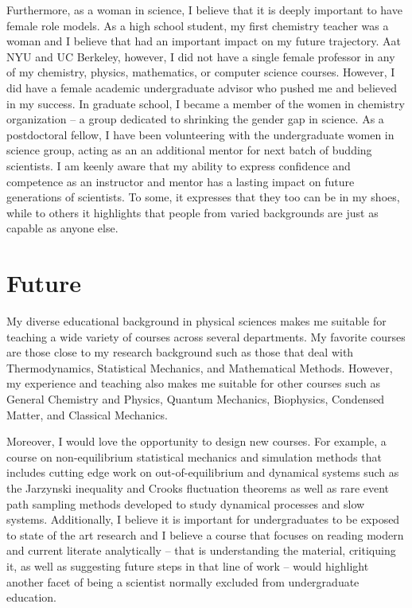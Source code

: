 \documentclass[11pt]{article}
\begin{document}
Furthermore, as a woman in science, I believe that it is deeply important to have female role models.  As a high school student, my first chemistry teacher was a woman and I believe that had an important impact on my future trajectory.  Aat NYU and UC Berkeley, however, I did not have a single female professor in any of my chemistry, physics, mathematics, or computer science courses.  However, I did have a female academic undergraduate advisor who pushed me and believed in my success.  In graduate school, I became a member of the women in chemistry organization -- a group dedicated to shrinking the gender gap in science.  As a postdoctoral fellow, I have been volunteering with the undergraduate women in science group, acting as an an additional mentor for next batch of budding scientists.  I am keenly aware that my ability to express confidence and competence as an instructor and mentor has a lasting impact on future generations of scientists.  To some, it expresses that they too can be in my shoes, while to others it highlights that people from varied backgrounds are just as capable as anyone else.

\section{Future} %

My diverse educational background in physical sciences makes me suitable for teaching a wide variety of courses across several departments.  My favorite courses are those close to my research background such as those that deal with Thermodynamics, Statistical Mechanics, and Mathematical Methods.  However, my experience and teaching also makes me suitable for other courses such as General Chemistry and Physics, Quantum Mechanics, Biophysics, Condensed Matter, and Classical Mechanics.

Moreover, I would love the opportunity to design new courses.  For example, a course on non-equilibrium statistical mechanics and simulation methods that includes cutting edge work on out-of-equilibrium and dynamical systems such as the Jarzynski inequality and Crooks fluctuation theorems as well as rare event path sampling methods developed to study dynamical processes and slow systems.  Additionally, I believe it is important for undergraduates to be exposed to state of the art research and I believe a course that focuses on reading modern and current literate analytically -- that is understanding the material, critiquing it, as well as suggesting future steps in that line of work -- would highlight another facet of being a scientist normally excluded from undergraduate education.
\end{document}

